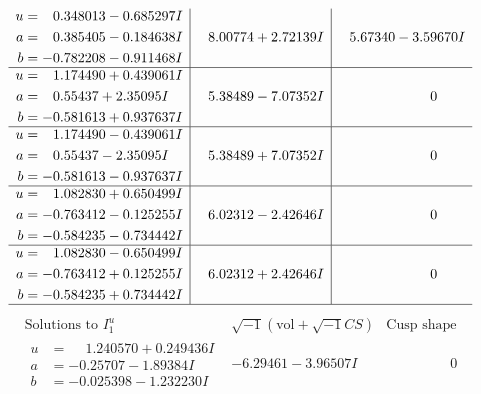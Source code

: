 \documentclass[1p]{elsarticle_modified}
\theoremstyle{definition}
\newcommand{\I}{\sqrt{-1}}
\begin{document}
$$\begin{array}{c|c|c}
\begin{aligned}
u &= \phantom{-}0.348013 - 0.685297 I \\
a &= \phantom{-}0.385405 - 0.184638 I \\
b &= -0.782208 - 0.911468 I\end{aligned}
 & \phantom{-}8.00774 + 2.72139 I & \phantom{-}5.67340 - 3.59670 I \\ \hline\begin{aligned}
u &= \phantom{-}1.174490 + 0.439061 I \\
a &= \phantom{-}0.55437 + 2.35095 I \\
b &= -0.581613 + 0.937637 I\end{aligned}
 & \phantom{-}5.38489 - 7.07352 I & \phantom{-0.000000 } 0 \\ \hline\begin{aligned}
u &= \phantom{-}1.174490 - 0.439061 I \\
a &= \phantom{-}0.55437 - 2.35095 I \\
b &= -0.581613 - 0.937637 I\end{aligned}
 & \phantom{-}5.38489 + 7.07352 I & \phantom{-0.000000 } 0 \\ \hline\begin{aligned}
u &= \phantom{-}1.082830 + 0.650499 I \\
a &= -0.763412 - 0.125255 I \\
b &= -0.584235 - 0.734442 I\end{aligned}
 & \phantom{-}6.02312 - 2.42646 I & \phantom{-0.000000 } 0 \\ \hline\begin{aligned}
u &= \phantom{-}1.082830 - 0.650499 I \\
a &= -0.763412 + 0.125255 I \\
b &= -0.584235 + 0.734442 I\end{aligned}
 & \phantom{-}6.02312 + 2.42646 I & \phantom{-0.000000 } 0\\
 \hline 
 \end{array}$$\newpage$$\begin{array}{c|c|c}  
\text{Solutions to }I^u_{1}& \I (\text{vol} + \sqrt{-1}CS) & \text{Cusp shape}\\
 \hline 
\begin{aligned}
u &= \phantom{-}1.240570 + 0.249436 I \\
a &= -0.25707 - 1.89384 I \\
b &= -0.025398 - 1.232230 I\end{aligned}
 & -6.29461 - 3.96507 I & \phantom{-0.000000 } 0 \\ \hline\begin{aligned}

\end{aligned}
\end{array}$$
\end{document}
